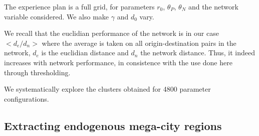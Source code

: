 \documentclass{jimis-en}
\begin{document}
The experience plan is a full grid, for parameters $r_0$, $\theta_P$, $\theta_N$ and the network variable considered.
We also make $\gamma$ and $d_0$ vary.

We recall that the euclidian performance of the network is in our case $<d_e/d_n>$ where the average is taken on all origin-destination pairs in the network, $d_e$ is the euclidian distance and $d_n$ the network distance. Thus, it indeed increases with network performance, in consistence with the use done here through thresholding.


We systematically explore the clusters obtained for 4800 parameter configurations.





\subsection{Extracting endogenous mega-city regions}
\end{document}
